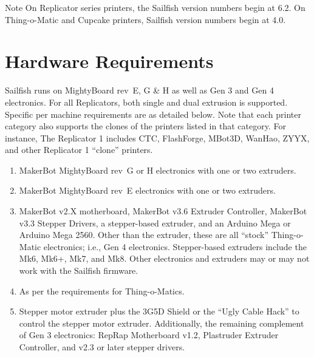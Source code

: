 \begin{bclogo}[logo=\bcinfo, noborder=true, couleurBarre=yellow]{Note}
On Replicator series printers, the Sailfish version numbers begin at 6.2.
On Thing-o-Matic and Cupcake printers, Sailfish version numbers begin at 4.0.
\end{bclogo}


\section{Hardware Requirements}

Sailfish runs on \gls{MightyBoard} rev~E, G \& H as well as \gls{Gen 3} and
\gls{Gen 4} electronics.
For all Replicators, both single and dual extrusion is supported.  Specific per
machine requirements are as detailed below.  Note that each printer category
also supports the clones of the printers listed in that category.  For instance, The
Replicator 1 includes CTC, FlashForge, MBot3D, WanHao, ZYYX, and
other Replicator 1 ``clone'' printers.

\begin{enumerate}
\item {} MakerBot MightyBoard rev~G or H
electronics with one or two extruders.
\item {} MakerBot MightyBoard rev~E electronics with
  one or two extruders.
\item {} MakerBot v2.X motherboard, MakerBot v3.6
Extruder Controller, MakerBot v3.3 Step\-per Dri\-vers, a stepper-based extruder,
and an Arduino Mega or Arduino Mega 2560. Other than the extruder, these are
all ``stock'' Thing-o-Matic electronics; i.e., Gen 4 electronics. Stepper-based
extruders include the Mk6, Mk6+, Mk7, and Mk8.  Other electronics and extruders
may or may not work with the Sailfish firmware.
\item {} As per the requirements for
  Thing-o-Matics.
\item {} Stepper motor extruder plus
 the 3G5D Shield or the ``Ugly Cable Hack'' to control the stepper motor
 extruder.  Additionally, the remaining complement of Gen 3 electronics: RepRap
 Motherboard v1.2, Plastruder Extruder Controller, and v2.3 or later stepper
 drivers.
\end{enumerate}

